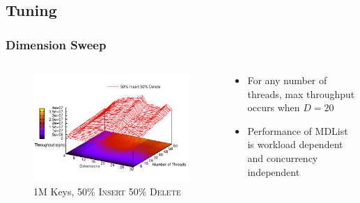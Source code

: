 \documentclass{beamer}
\begin{document}
\subsection{Tuning}
\begin{frame} \frametitle{Dimension Sweep}
    \begin{columns}
        \begin{column}{8cm}
            \begin{figure}[t]
                \centering
                \includegraphics[width=1\columnwidth]{amdsweep50ins.pdf}
                \caption{1M Keys, 50\% \textsc{Insert} 50\% \textsc{Delete}}
                \end{figure}
            \end{column}
            \begin{column}{4.3cm}
                \begin{itemize}
                    \item For any number of threads, max throughput occurs when $D=20$
                    \item Performance of MDList is workload dependent and concurrency independent
                \end{itemize}
            \end{column}
        \end{columns}
\end{frame}
\end{document}
